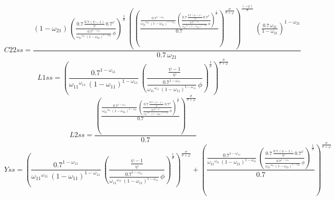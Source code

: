 \begin{dmath*}
C22ss = \frac{\left(1-{{\omega_{21}}}\right)\, \left(\frac{0.7\, \frac{0.7\, \left({{\psi}}-1\right)}{{{\psi}}}\, 0.7^{{{\varphi}}}}{\frac{0.7^{1-{{\omega_{11}}}}}{{{\omega_{21}}}^{{{\omega_{21}}}}\, \left(1-{{\omega_{21}}}\right)^{1-{{\omega_{21}}}}}\, {{\phi}}}\right)^{\frac{1}{{{\sigma}}}}\, \left(\left(\frac{\frac{0.7^{1-{{\omega_{11}}}}}{{{\omega_{21}}}^{{{\omega_{21}}}}\, \left(1-{{\omega_{21}}}\right)^{1-{{\omega_{21}}}}}\, \left(\frac{0.7\, \frac{0.7\, \left({{\psi}}-1\right)}{{{\psi}}}\, 0.7^{{{\varphi}}}}{\frac{0.7^{1-{{\omega_{11}}}}}{{{\omega_{21}}}^{{{\omega_{21}}}}\, \left(1-{{\omega_{21}}}\right)^{1-{{\omega_{21}}}}}\, {{\phi}}}\right)^{\frac{1}{{{\sigma}}}}}{0.7}\right)^{\frac{{{\sigma}}}{{{\sigma}}+{{\varphi}}}}\right)^{\frac{\left(-{{\varphi}}\right)}{{{\sigma}}}}\, \left(\frac{0.7\, {{\omega_{21}}}}{1-{{\omega_{21}}}}\right)^{1-{{\omega_{21}}}}}{0.7\, {{\omega_{21}}}}
\end{dmath*}
\begin{dmath*}
L1ss = \left(\frac{0.7^{1-{{\omega_{11}}}}}{{{\omega_{11}}}^{{{\omega_{11}}}}\, \left(1-{{\omega_{11}}}\right)^{1-{{\omega_{11}}}}}\, \left(\frac{\frac{{{\psi}}-1}{{{\psi}}}}{\frac{0.7^{1-{{\omega_{11}}}}}{{{\omega_{11}}}^{{{\omega_{11}}}}\, \left(1-{{\omega_{11}}}\right)^{1-{{\omega_{11}}}}}\, {{\phi}}}\right)^{\frac{1}{{{\sigma}}}}\right)^{\frac{{{\sigma}}}{{{\sigma}}+{{\varphi}}}}
\end{dmath*}
\begin{dmath*}
L2ss = \frac{\left(\frac{\frac{0.7^{1-{{\omega_{11}}}}}{{{\omega_{21}}}^{{{\omega_{21}}}}\, \left(1-{{\omega_{21}}}\right)^{1-{{\omega_{21}}}}}\, \left(\frac{0.7\, \frac{0.7\, \left({{\psi}}-1\right)}{{{\psi}}}\, 0.7^{{{\varphi}}}}{\frac{0.7^{1-{{\omega_{11}}}}}{{{\omega_{21}}}^{{{\omega_{21}}}}\, \left(1-{{\omega_{21}}}\right)^{1-{{\omega_{21}}}}}\, {{\phi}}}\right)^{\frac{1}{{{\sigma}}}}}{0.7}\right)^{\frac{{{\sigma}}}{{{\sigma}}+{{\varphi}}}}}{0.7}
\end{dmath*}
\begin{dmath*}
Yss = \left(\frac{0.7^{1-{{\omega_{11}}}}}{{{\omega_{11}}}^{{{\omega_{11}}}}\, \left(1-{{\omega_{11}}}\right)^{1-{{\omega_{11}}}}}\, \left(\frac{\frac{{{\psi}}-1}{{{\psi}}}}{\frac{0.7^{1-{{\omega_{11}}}}}{{{\omega_{11}}}^{{{\omega_{11}}}}\, \left(1-{{\omega_{11}}}\right)^{1-{{\omega_{11}}}}}\, {{\phi}}}\right)^{\frac{1}{{{\sigma}}}}\right)^{\frac{{{\sigma}}}{{{\sigma}}+{{\varphi}}}}+\left(\frac{\frac{0.7^{1-{{\omega_{11}}}}}{{{\omega_{21}}}^{{{\omega_{21}}}}\, \left(1-{{\omega_{21}}}\right)^{1-{{\omega_{21}}}}}\, \left(\frac{0.7\, \frac{0.7\, \left({{\psi}}-1\right)}{{{\psi}}}\, 0.7^{{{\varphi}}}}{\frac{0.7^{1-{{\omega_{11}}}}}{{{\omega_{21}}}^{{{\omega_{21}}}}\, \left(1-{{\omega_{21}}}\right)^{1-{{\omega_{21}}}}}\, {{\phi}}}\right)^{\frac{1}{{{\sigma}}}}}{0.7}\right)^{\frac{{{\sigma}}}{{{\sigma}}+{{\varphi}}}}
\end{dmath*}
